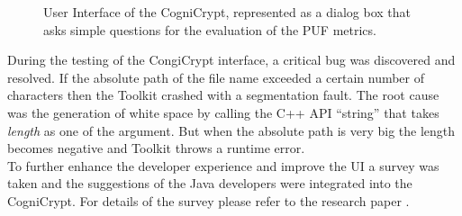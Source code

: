 \begin{figure}
\centering
{}
\caption{User Interface of the CogniCrypt, represented as a dialog box that asks simple questions for the evaluation of the PUF metrics.}
\label{img:cogni_ui}
\end{figure}

During the testing of the CongiCrypt interface, a critical bug was discovered and resolved. If the absolute path of the file name exceeded a certain number of characters then the Toolkit crashed with a segmentation fault. The root cause was the generation of white space by calling the C++ API ``string'' that takes \emph{length} as one of the argument. But when the absolute path is very big the length becomes negative and Toolkit throws a runtime error.\\

To further enhance the developer experience and improve the UI a survey was taken and the suggestions of the Java developers were integrated into the CogniCrypt. For details of the survey please refer to the research paper \cite{crypto_icse}.

